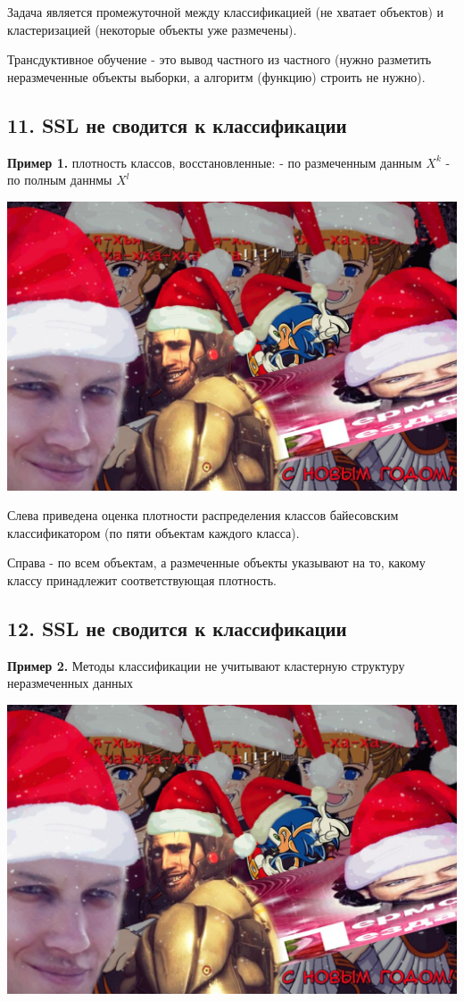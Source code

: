 Задача является промежуточной между классификацией (не хватает объектов) и
кластеризацией (некоторые объекты уже размечены).

Трансдуктивное обучение - это вывод частного из частного (нужно разметить
неразмеченные объекты выборки, а алгоритм (функцию) строить не нужно).

\subsection{11. SSL не сводится к классификации}

\textbf{Пример 1.}
плотность классов, восстановленные:
- по размеченным данным $X^k$
- по полным даннмы $X^l$

\includegraphics[scale=0.3]{figures/samplefigure.jpg}

Слева приведена оценка плотности распределения классов байесовским
классификатором (по пяти объектам каждого класса).

Справа - по всем объектам, а размеченные объекты указывают на то, какому
классу принадлежит соответствующая плотность.

\subsection{12. SSL не сводится к классификации}

\textbf{Пример 2.}
Методы классификации не учитывают кластерную структуру неразмеченных данных

\includegraphics[scale=0.3]{figures/samplefigure.jpg}

